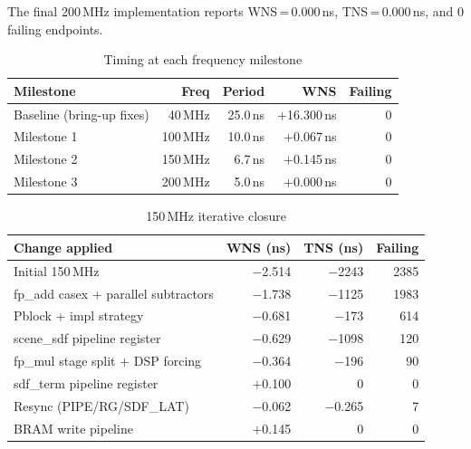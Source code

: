   The final 200\,MHz implementation reports WNS\,=\,0.000\,ns,
  TNS\,=\,0.000\,ns, and 0 failing endpoints.

  \begin{table}[h!]
  \centering
  \caption{Timing at each frequency milestone}
  \begin{tabular}{lrrrr}
  \hline
  \textbf{Milestone} & \textbf{Freq} & \textbf{Period} & \textbf{WNS} & \textbf{Failing} \\
  \hline
  Baseline (bring-up fixes) & 40\,MHz  & 25.0\,ns & $+$16.300\,ns & 0 \\
  Milestone 1               & 100\,MHz & 10.0\,ns & $+$0.067\,ns  & 0 \\
  Milestone 2               & 150\,MHz &  6.7\,ns & $+$0.145\,ns  & 0 \\
  Milestone 3               & 200\,MHz &  5.0\,ns & $+$0.000\,ns  & 0 \\
  \hline
  \end{tabular}
  \end{table}

  \begin{table}[h!]
  \centering
  \caption{150\,MHz iterative closure}
  \begin{tabular}{lrrr}
  \hline
  \textbf{Change applied} & \textbf{WNS (ns)} & \textbf{TNS (ns)} & \textbf{Failing} \\
  \hline
  Initial 150\,MHz                     & $-$2.514 & $-$2243   & 2385 \\
  fp\_add casex + parallel subtractors & $-$1.738 & $-$1125   & 1983 \\
  Pblock + impl strategy               & $-$0.681 & $-$173    &  614 \\
  scene\_sdf pipeline register         & $-$0.629 & $-$1098   &  120 \\
  fp\_mul stage split + DSP forcing    & $-$0.364 & $-$196    &   90 \\
  sdf\_term pipeline register          & $+$0.100 &     0     &    0 \\
  Resync (PIPE/RG/SDF\_LAT)           & $-$0.062 & $-$0.265  &    7 \\
  BRAM write pipeline                  & $+$0.145 &     0     &    0 \\
  \hline
  \end{tabular}
  \end{table}

